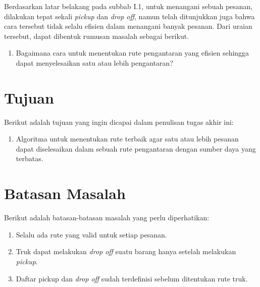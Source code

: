 Berdasarkan latar belakang pada subbab I.1, untuk menangani sebuah pesanan, dilakukan tepat 
sekali \textit{pickup} dan \textit{drop off}, namun telah ditunjukkan juga bahwa cara tersebut 
tidak selalu efisien dalam menangani banyak pesanan. 
Dari uraian tersebut, dapat dibentuk rumusan masalah sebagai berikut.

\begin{enumerate}
    \item Bagaimana cara untuk menentukan rute pengantaran yang efisien sehingga dapat menyelesaikan satu atau lebih pengantaran?
\end{enumerate}

\section{Tujuan}

Berikut adalah tujuan yang ingin dicapai dalam penulisan tugas akhir ini:

\begin{enumerate}
    \item Algoritma untuk menentukan rute terbaik agar satu atau lebih pesanan dapat diselesaikan dalam sebuah rute pengantaran dengan sumber daya yang terbatas.
\end{enumerate}

\section{Batasan Masalah}

Berikut adalah batasan-batasan masalah yang perlu diperhatikan:

\begin{enumerate}
    \item Selalu ada rute yang valid untuk setiap pesanan.
    \item Truk dapat melakukan \textit{drop off} suatu barang hanya setelah melakukan \textit{pickup}.
    \item Daftar pickup dan \textit{drop off} sudah terdefinisi sebelum ditentukan rute truk.
\end{enumerate}

